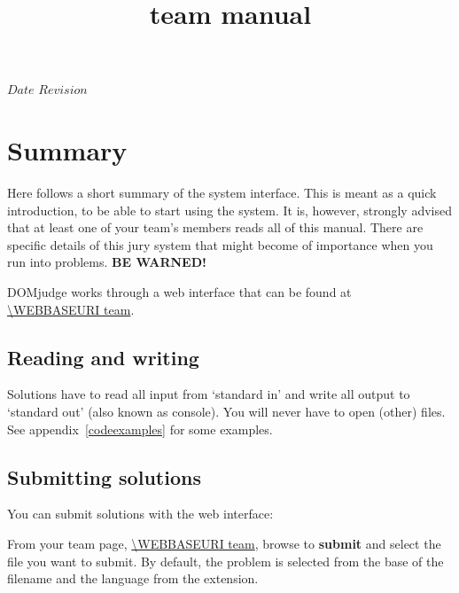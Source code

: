 

\usepackage[english]{babel}

\SVN $Date$
\SVN $Revision$

\title{\DOMjudge team manual}




\titlestuff{\DOMJUDGEVERSION}{\SVNRevision}{\SVNDate}{\today}

\section*{Summary}

Here follows a short summary of the system interface. This is meant as
a quick introduction, to be able to start using the system. It is,
however, strongly advised that at least one of your team's members
reads all of this manual. There are specific details of this
jury system that might become of importance when you run into
problems. \textbf{BE WARNED!}

DOMjudge works through a web interface that can be found at\\
\url{\WEBBASEURI team}.

\subsection*{Reading and writing}

Solutions have to read all input from `standard in' and write all
output to `standard out' (also known as console). You will never have
to open (other) files. See appendix~\ref{codeexamples} for some
examples.

\subsection*{Submitting solutions}

You can submit solutions with%
the web interface:
\begin{description}[\breaklabel\setlabelstyle{\bfseries}]
\item[Web interface]
From your team page, \url{\WEBBASEURI team}, browse to
\textbf{submit} and select the file you want to submit. By default,
the problem is selected from the base of the filename and the language
from the extension.
\end{description}

